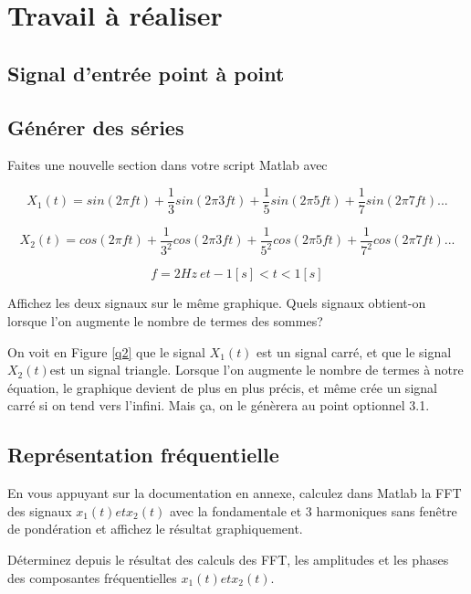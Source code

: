 \section{Travail à réaliser}
\subsection{Signal d'entrée point à point}








\subsection{Générer des séries}
Faites une nouvelle section dans votre script Matlab avec %

$$ X_{1}(t)=sin(2\pi f t)+\frac{1}{3}sin(2\pi 3ft)+\frac{1}{5}sin(2\pi 5ft)+\frac{1}{7}sin(2\pi 7ft)...$$

$$ X_{2}(t)=cos(2\pi ft)+\frac{1}{3^2}cos(2\pi 3ft)+\frac{1}{5^2}cos(2\pi 5ft)+\frac{1}{7^2}cos(2\pi 7ft)...$$

$$f = 2Hz~et -1[s]<t<1[s]$$

Affichez les deux signaux sur le même graphique. Quels signaux obtient-on lorsque l'on augmente le nombre de termes des sommes?


On voit en Figure \ref{q2} que le signal $X_1(t)$ est un signal carré, et que le signal $X_2(t)$est un signal triangle. Lorsque l'on augmente le nombre de termes à notre équation, le graphique devient de plus en plus précis, et même crée un signal carré si on tend vers l'infini. Mais ça, on le génèrera au point optionnel 3.1.

\newpage
\subsection{Représentation fréquentielle}

En vous appuyant sur la documentation en annexe, calculez dans Matlab la FFT des signaux $x_1 (t) et x_2 (t)$ avec la fondamentale et 3 harmoniques sans fenêtre de pondération et affichez le résultat graphiquement.

Déterminez depuis le résultat des calculs des FFT, les amplitudes et les phases des composantes fréquentielles $x_1 (t) et x_2 (t)$.


